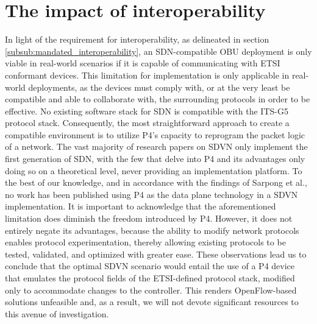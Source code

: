     \section{The impact of interoperability}
    In light of the requirement for interoperability, as delineated in section \ref{subsub:mandated_interoperability}, an SDN-compatible OBU deployment is only viable in real-world scenarios if it is capable of communicating with ETSI conformant devices. This limitation for implementation is only applicable in real-world deployments, as the devices must comply with, or at the very least be compatible and able to collaborate with, the surrounding protocols in order to be effective. No existing software stack for SDN is compatible with the ITS-G5 protocol stack. Consequently, the most straightforward approach to create a compatible environment is to utilize P4’s capacity to reprogram the packet logic of a network. 
    The vast majority of research papers on SDVN only implement the first generation of SDN, with the few that delve into P4 and its advantages only doing so on a theoretical level, never providing an implementation platform. To the best of our knowledge, and in accordance with the findings of Sarpong et al.\cite{sarpong_potential_2023}, no work has been published using P4 as the data plane technology in a SDVN implementation. 
    It is important to acknowledge that the aforementioned limitation does diminish the freedom introduced by P4. However, it does not entirely negate its advantages, because the ability to modify network protocols enables protocol experimentation, thereby allowing existing protocols to be tested, validated, and optimized with greater ease.
    These observations lead us to conclude that the optimal SDVN scenario would entail the use of a P4 device that emulates the protocol fields of the ETSI-defined protocol stack, modified only to accommodate changes to the controller. This renders OpenFlow-based solutions unfeasible and, as a result, we will not devote significant resources to this avenue of investigation.
    
